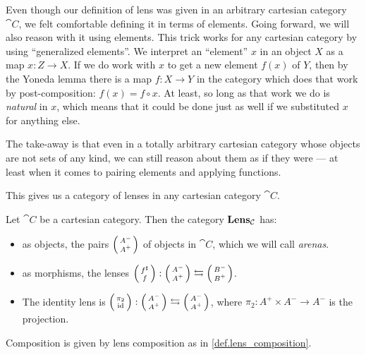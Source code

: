\documentclass[DynamicalBook]{subfiles}
\begin{document}
\begin{remark}\label{rmk.generalized_elements}
  Even though our definition of lens was given in an arbitrary cartesian
  category $\cat{C}$, we felt comfortable defining it in terms of elements.
  Going forward, we will also reason with it using elements. This trick works for any cartesian category by using
  ``generalized elements''. We interpret an ``element'' $x$ in an object $X$ as
  a map $x : Z \to X$. If we do work with $x$ to get a new element $f(x)$ of
  $Y$, then by the Yoneda lemma there is a map $f : X \to Y$ in
  the category which does that work by post-composition: $f(x) = f \circ x$. At least, so long as that work we do is \emph{natural} in $x$, which means that it could be done just as well if we substituted $x$ for anything else.

  The take-away is that even in a totally arbitrary cartesian category whose
  objects are not sets of any kind, we can still reason about them as if they
  were --- at least when it comes to pairing elements and applying functions.
\end{remark}

This gives us a category of lenses in any cartesian category $\cat{C}$.

\begin{definition}\label{def.lens_category}
Let $\cat{C}$ be a cartesian category. Then the category $\textbf{Lens}_{\mathcal{C}}$
has:
\begin{itemize}
\item as objects, the pairs $\lens{A^-}{A^+}$ of objects in $\cat{C}$, which we will
  call \emph{arenas}.
\item as morphisms, the lenses $\lens{f^{\sharp}}{f} : \lens{A^-}{A^+} \leftrightarrows \lens{B^-}{B^+}$.
\item The identity lens is $\lens{\pi_2}{\id} : \lens{A^-}{A^+} \leftrightarrows
  \lens{A^-}{A^+}$, where $\pi_2 : A^+ \times A^- \to A^-$ is the projection.
\end{itemize}
\item Composition is given by lens composition as in \cref{def.lens_composition}.
\end{definition}

\end{document}
